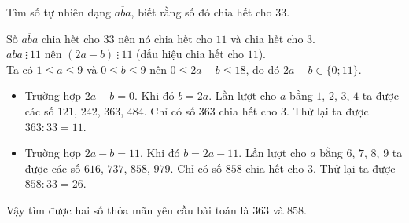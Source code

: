 \begin{vd}%
 Tìm số tự nhiên dạng $\overline{aba}$, biết rằng số đó chia hết cho $33$.
 \loigiai
  {
  Số $\overline{aba}$ chia hết cho $33$ nên nó chia hết cho $11$ và chia hết cho $3$.\\
  $\overline{aba}\ \vdots\ 11$ nên $(2a-b)\ \vdots\ 11$ (dấu hiệu chia hết cho $11$).\\
  Ta có $1 \leq a \leq 9$ và $0 \leq b \leq 9$ nên $0 \leq 2a-b \leq 18$, do đó $2a-b \in \{0;11\}$.
  \begin{itemize}
   \item Trường hợp $2a-b=0$. Khi đó $b=2a$. Lần lượt cho $a$ bằng $1$, $2$, $3$, $4$ ta được các số $121$, $242$, $363$, $484$. Chỉ có số $363$ chia hết cho $3$. Thử lại ta được $363 : 33 = 11$.
   \item Trường hợp $2a-b=11$. Khi đó $b=2a-11$. Lần lượt cho $a$ bằng $6$, $7$, $8$, $9$ ta được các số $616$, $737$, $858$, $979$. Chỉ có số $858$ chia hết cho $3$. Thử lại ta được $858 : 33 = 26$.
  \end{itemize}
  Vậy tìm được hai số thỏa mãn yêu cầu bài toán là $363$ và $858$.
  }
\end{vd}

